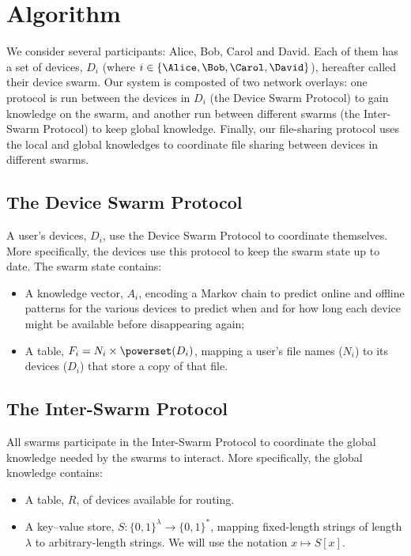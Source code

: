 \section{Algorithm}%
\label{Algorithm}


We consider several participants: Alice, Bob, Carol and David.
Each of them has a set of devices, \(D_i\) (where \(i\in \{\Alice, \Bob, \Carol, 
  \David\}\)), hereafter called their device swarm.
Our system is composted of two network overlays: one protocol is run between the 
devices in \(D_i\) (the Device Swarm Protocol) to gain knowledge on the 
swarm, and another run between different swarms (the Inter-Swarm Protocol) to 
keep global knowledge.
Finally, our file-sharing protocol uses the local and global 
knowledges to coordinate file sharing between devices in different swarms.

\subsection{The Device Swarm Protocol}%
\label{DeviceSwarmProtocol}

A user's devices, \(D_i\), use the Device Swarm Protocol to coordinate 
themselves.
More specifically, the devices use this protocol to keep the swarm state up to 
date.
The swarm state contains:
\begin{itemize}
  \item A knowledge vector, \(A_i\), encoding a Markov chain to predict online 
    and offline patterns for the various devices to predict when and for how 
    long each device might be available before disappearing again;
  \item A table, \(F_i = N_i\times \powerset(D_i)\), mapping a user's file names 
    (\(N_i\)) to its devices (\(D_i\)) that store a copy of that file.
\end{itemize}


\subsection{The Inter-Swarm Protocol}%
\label{InterSwarmProtocol}

All swarms participate in the Inter-Swarm Protocol to coordinate the global 
knowledge needed by the swarms to interact.
More specifically, the global knowledge contains:
\begin{itemize}
  \item A table, \(R\), of devices available for routing.
  \item A key--value store, \(S\colon \{0, 1\}^\lambda\to \{0, 1\}^*\), mapping 
    fixed-length strings of length \(\lambda\) to arbitrary-length strings.
    We will use the notation \(x\mapsto S[x]\).
\end{itemize}

